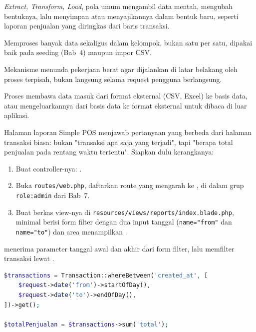 \begin{istilahpenting}
\begin{description}[leftmargin=0pt,style=nextline]
  \item[ETL] \textit{Extract, Transform, Load}, pola umum mengambil data mentah, mengubah bentuknya, lalu menyimpan atau menyajikannya dalam bentuk baru, seperti laporan penjualan yang diringkas dari baris transaksi.
  \item[Batch Processing] Memproses banyak data sekaligus dalam kelompok, bukan satu per satu, dipakai baik pada seeding (Bab~4) maupun impor CSV.
  \item[Antrean (Queue)] Mekanisme menunda pekerjaan berat agar dijalankan di latar belakang oleh proses terpisah, bukan langsung selama request pengguna berlangsung.
  \item[Import/Export] Proses membawa data masuk dari format eksternal (CSV, Excel) ke basis data, atau mengeluarkannya dari basis data ke format eksternal untuk dibaca di luar aplikasi.
\end{description}
\end{istilahpenting}

Halaman laporan Simple POS menjawab pertanyaan yang berbeda dari
halaman transaksi biasa: bukan "transaksi apa saja yang terjadi", tapi
"berapa total penjualan pada rentang waktu tertentu". Siapkan dulu
kerangkanya:

\begin{enumerate}
  \item Buat controller-nya: .
  \item Buka \texttt{routes/web.php}, daftarkan route
     yang mengarah ke
    , di dalam grup
    \texttt{role:admin} dari Bab~7.
  \item Buat berkas view-nya di
    \texttt{resources/views\allowbreak/reports\allowbreak/index.blade.php}, minimal berisi
    form filter dengan dua input tanggal (\texttt{name="from"} dan
    \texttt{name="to"}) dan area menampilkan .
\end{enumerate}

 menerima parameter tanggal awal dan
akhir dari form filter, lalu memfilter transaksi lewat
.

\begin{lstlisting}[language=php, title=\lstfile{app/Http/Controllers/ReportController.php}]
$transactions = Transaction::whereBetween('created_at', [
    $request->date('from')->startOfDay(),
    $request->date('to')->endOfDay(),
])->get();

$totalPenjualan = $transactions->sum('total');
\end{lstlisting}


